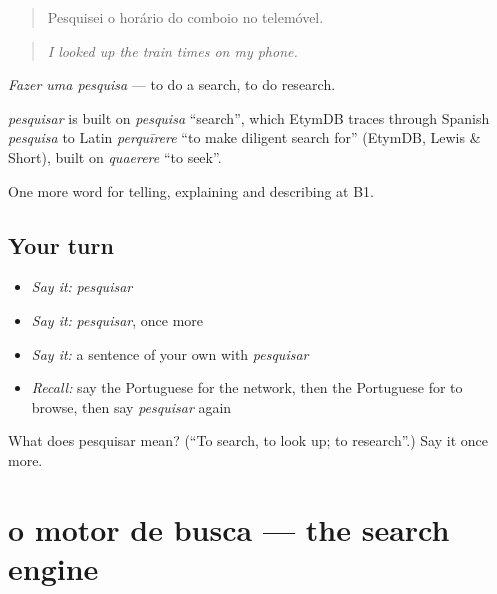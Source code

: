 \begin{quote}
Pesquisei o horário do comboio no telemóvel.
\end{quote}

\begin{quote}
\emph{I looked up the train times on my phone.}
\end{quote}

\emph{Fazer uma pesquisa} — to do a search, to do research.

\begin{cousinweb}
\emph{pesquisar} is built on \emph{pesquisa} \textquotedblleft{}search\textquotedblright{}, which EtymDB traces through Spanish \emph{pesquisa} to Latin \emph{perquīrere} \textquotedblleft{}to make diligent search for\textquotedblright{} (EtymDB, Lewis \& Short), built on \emph{quaerere} \textquotedblleft{}to seek\textquotedblright{}.
\end{cousinweb}

\begin{grammarlens}[title={What you've built}]
One more word for telling, explaining and describing at B1.
\end{grammarlens}

\subsection*{Your turn}
\begin{itemize}
\raggedright
  \item \emph{Say it:} \emph{pesquisar}
  \item \emph{Say it:} \emph{pesquisar}, once more
  \item \emph{Say it:} a sentence of your own with \emph{pesquisar}
  \item \emph{Recall:} say the Portuguese for the network, then the Portuguese for to browse, then say \emph{pesquisar} again
\end{itemize}

\begin{tcolorbox}[breakable,colback=teal!4,colframe=teal!35!black,title={Before you move on}]
What does pesquisar mean? (\textquotedblleft{}To search, to look up; to research\textquotedblright{}.) Say it once more.
\end{tcolorbox}
\section[o motor de busca]{o motor de busca — the search engine}

\label{lesson:PT-C399-motor-de-busca}




